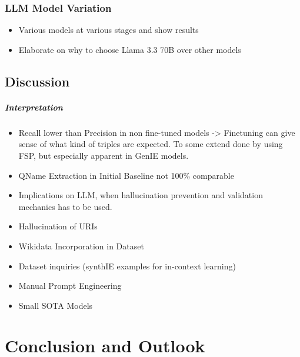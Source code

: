 \documentclass[a4paper,oneside,bibliography=totoc]{scrbook}
\begin{document}
\subsection{LLM Model Variation}
\label{subsec:llm_model_variation}
\begin{itemize}
  \item Various models at various stages and show results
  \item Elaborate on why to choose Llama 3.3 70B over other models
\end{itemize}

\section{Discussion}
\label{sec:discussion}

\paragraph{Interpretation}
\begin{itemize}
  \item Recall lower than Precision in non fine-tuned models -> Finetuning can give sense of what kind of triples are expected. To some extend done by using FSP, but especially apparent in GenIE models.
  \item QName Extraction in Initial Baseline not 100\% comparable
  \item Implications on LLM, when hallucination prevention and validation mechanics has to be used.
\end{itemize}

\begin{itemize}
  \item Hallucination of URIs
  \item Wikidata Incorporation in Dataset
  \item Dataset inquiries (synthIE examples for in-context learning)
  \item Manual Prompt Engineering
  \item Small SOTA Models
\end{itemize}

\chapter{Conclusion and Outlook}
\label{ch:conclusion_outlook}



\end{document}
